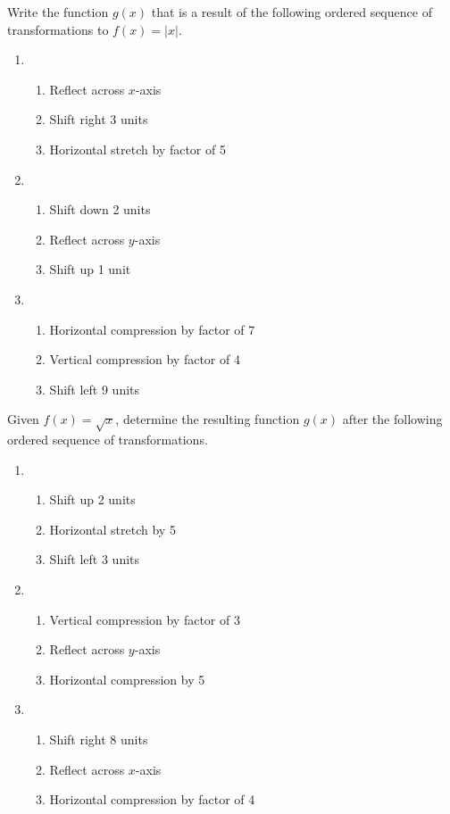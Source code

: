 \documentclass{article}
\newcounter{Review}
\begin{document}
Write the function $g(x)$ that is a result of the following ordered sequence of transformations to $f(x)=|x|$.
\begin{enumerate}
\setcounter{enumi}{\value{Review}}
\item
\begin{enumerate}[(1)]
\item Reflect across $x$-axis
\item Shift right 3 units
\item Horizontal stretch by factor of 5
\end{enumerate}

\item
\begin{enumerate}[(1)]
\item Shift down 2 units
\item Reflect across $y$-axis
\item Shift up 1 unit
\end{enumerate}

\item
\begin{enumerate}[(1)]
\item Horizontal compression by factor of 7
\item Vertical compression by factor of 4
\item Shift left 9 units
\end{enumerate}
\setcounter{Review}{\value{enumi}}
\end{enumerate}

Given $f(x) = \sqrt{x}$, determine the resulting function $g(x)$ after the following ordered sequence of transformations.
\begin{enumerate}
\setcounter{enumi}{\value{Review}}
\item
\begin{enumerate}[(1)]
\item Shift up 2 units
\item Horizontal stretch by 5
\item Shift left 3 units
\end{enumerate}

\item
\begin{enumerate}[(1)]
\item Vertical compression by factor of 3
\item Reflect across $y$-axis
\item Horizontal compression by 5
\end{enumerate}

\item
\begin{enumerate}[(1)]
\item Shift right 8 units
\item Reflect across $x$-axis
\item Horizontal compression by factor of 4
\end{enumerate}
\setcounter{Review}{\value{enumi}}
\end{enumerate}
\end{document}
